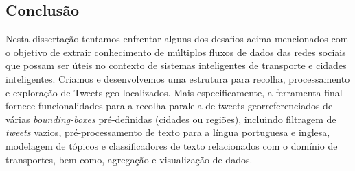 \documentclass[9pt,a4paper]{extarticle}
\begin{document}
\begin{multicols}{2}






\section{Conclusão}\label{sec:conclusion}

Nesta dissertação tentamos enfrentar alguns dos desafios acima mencionados com o objetivo de extrair conhecimento de múltiplos fluxos de dados das redes sociais que possam ser úteis no contexto de sistemas inteligentes de transporte e cidades inteligentes. Criamos e desenvolvemos uma estrutura para recolha, processamento e exploração de Tweets geo-localizados. Mais especificamente, a ferramenta final fornece funcionalidades para a recolha paralela de tweets georreferenciados de várias \emph{bounding-boxes} pré-definidas (cidades ou regiões), incluindo filtragem de \emph{tweets} vazios, pré-processamento de texto para a língua portuguesa e inglesa, modelagem de tópicos e classificadores de texto relacionados com o domínio de transportes, bem como, agregação e visualização de dados.





\end{multicols}
\end{document}
